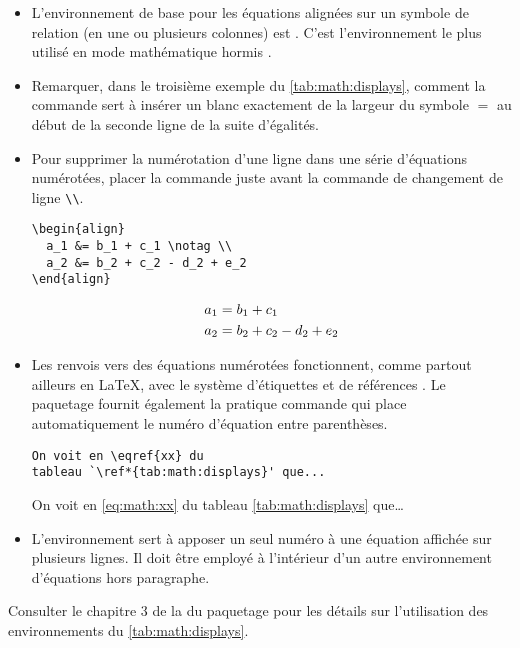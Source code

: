 \begin{itemize}
\item L'environnement de base pour les équations alignées sur un
  symbole de relation (en une ou plusieurs colonnes) est .
  C'est l'environnement le plus utilisé en mode mathématique hormis
  .
\item Remarquer, dans le troisième exemple du
  \autoref{tab:math:displays}, comment la commande \cmd{\phantom} sert
  à insérer un blanc exactement de la largeur du symbole $=$ au début
  de la seconde ligne de la suite d'égalités.
\item Pour supprimer la numérotation d'une ligne dans une série
  d'équations numérotées, placer la commande \cmd{\notag} juste avant
  la commande de changement de ligne \verb=\\=.
  \begin{demo}
    \begin{texample}
\begin{lstlisting}
\begin{align}
  a_1 &= b_1 + c_1 \notag \\
  a_2 &= b_2 + c_2 - d_2 + e_2
\end{align}
\end{lstlisting}
      \producing
      \begin{align}
        a_1& =b_1+c_1 \notag \\
        a_2& =b_2+c_2-d_2+e_2
      \end{align}
    \end{texample}
  \end{demo}
\item Les renvois vers des équations numérotées fonctionnent, comme
  partout ailleurs en {\LaTeX}, avec le système d'étiquettes et de
  références \citep[][ou la \autoref{sec:tableaux:floats}]{UL:latex:1}. Le paquetage
   fournit également la pratique commande \cmd{\eqref}
  qui place automatiquement le numéro d'équation entre parenthèses.
  \begin{demo}
    \begin{texample}
\begin{lstlisting}
On voit en \eqref{xx} du
tableau `\ref*{tab:math:displays}' que...
\end{lstlisting}
      \producing
      On voit en \eqref{eq:math:xx} du tableau
      \ref*{tab:math:displays} que\dots
    \end{texample}
  \end{demo}
\item L'environnement  sert à apposer un seul numéro à une
  équation affichée sur plusieurs lignes. Il doit être employé à
  l'intérieur d'un autre environnement d'équations hors paragraphe.
\end{itemize}
Consulter le chapitre 3 de la %
du paquetage  pour les détails sur
l'utilisation des environnements du \autoref*{tab:math:displays}.

